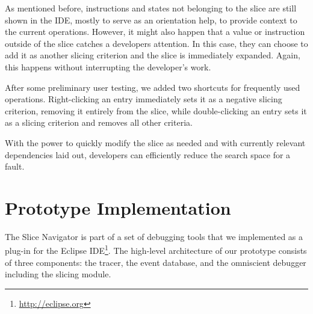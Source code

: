 As mentioned before, instructions and states not belonging to the slice are still shown in the IDE, mostly to serve as an orientation help, to provide context to the current operations.
However, it might also happen that a value or instruction outside of the slice catches a developers attention.
In this case, they can choose to add it as another slicing criterion and the slice is immediately expanded.
Again, this happens without interrupting the developer's work.

After some preliminary user testing, we added two shortcuts for frequently used operations.
Right-clicking an entry immediately sets it as a negative slicing criterion, removing it entirely from the slice, while double-clicking an entry sets it as a slicing criterion and removes all other criteria.

With the power to quickly modify the slice as needed and with currently relevant dependencies laid out, developers can efficiently reduce the search space for a fault.



\section{Prototype Implementation}
\label{sec:impl}


The Slice Navigator is part of a set of debugging tools that we implemented as a plug-in for the Eclipse IDE\footnote{\url{http://eclipse.org}}.
%
%
The high-level architecture of our prototype consists of three components: the tracer, the event database, and the omniscient debugger including the slicing module.

%
%


